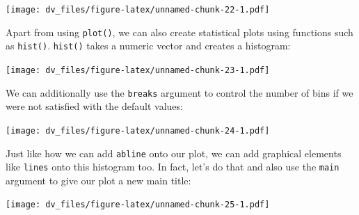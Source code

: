 \documentclass[]{article}
\newenvironment{Shaded}{\begin{snugshade}}{\end{snugshade}}
\newcommand{\DataTypeTok}[1]{\textcolor[rgb]{0.13,0.29,0.53}{#1}}
\newcommand{\DecValTok}[1]{\textcolor[rgb]{0.00,0.00,0.81}{#1}}
\newcommand{\KeywordTok}[1]{\textcolor[rgb]{0.13,0.29,0.53}{\textbf{#1}}}
\newcommand{\NormalTok}[1]{#1}
\newcommand{\OperatorTok}[1]{\textcolor[rgb]{0.81,0.36,0.00}{\textbf{#1}}}
\newcommand{\StringTok}[1]{\textcolor[rgb]{0.31,0.60,0.02}{#1}}
\begin{document}
\texttt{[image: dv\_files/figure-latex/unnamed-chunk-22-1.pdf]}

Apart from using \texttt{plot()}, we can also create statistical plots
using functions such as \texttt{hist()}. \texttt{hist()} takes a numeric
vector and creates a histogram:

\begin{Shaded}
\end{Shaded}

\texttt{[image: dv\_files/figure-latex/unnamed-chunk-23-1.pdf]}

We can additionally use the \texttt{breaks} argument to control the
number of bins if we were not satisfied with the default values:

\begin{Shaded}
\end{Shaded}

\texttt{[image: dv\_files/figure-latex/unnamed-chunk-24-1.pdf]}

Just like how we can add \texttt{abline} onto our plot, we can add
graphical elements like \texttt{lines} onto this histogram too. In fact,
let's do that and also use the \texttt{main} argument to give our plot a
new main title:

\begin{Shaded}
\end{Shaded}

\texttt{[image: dv\_files/figure-latex/unnamed-chunk-25-1.pdf]}
\end{document}
